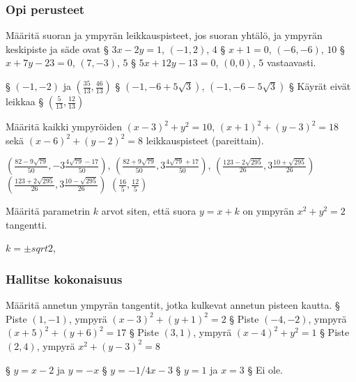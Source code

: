 \begin{tehtavasivu}

\subsubsection*{Opi perusteet}

\begin{tehtava}
Määritä suoran ja ympyrän leikkauspisteet, jos suoran yhtälö, ja ympyrän keskipiste ja säde ovat
\alakohdat
§ $3x-2y = 1$, $(-1,2)$, $4$
§ $x+1 = 0$, $(-6,-6)$, $10$
§ $x+7y-23 = 0$, $(7,-3)$, $5$
§ $5x+12y-13 = 0$, $(0,0)$, $5$
\loppu
vastaavasti.
\begin{vastaus}
\alakohdat
§ $(-1,-2)$ ja $(\frac{35}{13},\frac{46}{13})$
§ $(-1,-6+5\sqrt{3})$, $(-1,-6-5\sqrt{3})$
§ Käyrät eivät leikkaa
§ $(\frac{5}{13},\frac{12}{13})$
\loppu
\end{vastaus}
\end{tehtava}

\begin{tehtava}
Määritä kaikki ympyröiden $ (x-3)^2+y^2= 10$, $(x+1)^2+(y-3)^2 = 18$ sekä $(x-6)^2+(y-2)^2 = 8$ leikkauspisteet (pareittain).
\begin{vastaus}
$(\frac{82-9\sqrt{79}}{50},-3\frac{4\sqrt{79}-17}{50})$, $(\frac{82+9\sqrt{79}}{50},3\frac{4\sqrt{79}+17}{50})$,
$(\frac{123-2\sqrt{295}}{26}, 3\frac{10+\sqrt{295}}{26})$
$(\frac{123+2\sqrt{295}}{26}, 3\frac{10-\sqrt{295}}{26})$
$(\frac{16}{5}, \frac{12}{5})$
\end{vastaus}
\end{tehtava}

\begin{tehtava}
Määritä parametrin $k$ arvot siten, että suora $y=x+k$ on ympyrän  $ x^2+y^2= 2$ tangentti.
\begin{vastaus}
$k = \pm sqrt{2} $,
\end{vastaus}
\end{tehtava}


\subsubsection*{Hallitse kokonaisuus}
\begin{tehtava}
	Määritä annetun ympyrän tangentit, jotka kulkevat annetun pisteen kautta.
	\alakohdat
		§ Piste $(1, -1)$, ympyrä $(x-3)^2 + (y+1)^2 = 2$
		§ Piste $(-4, -2)$, ympyrä $(x+5)^2 + (y+6)^2 = 17$
		§ Piste $(3, 1)$, ympyrä $(x-4)^2 + y^2 = 1$
		§ Piste $(2, 4)$, ympyrä $x^2 + (y-3)^2 = 8$
	\loppu
	\begin{vastaus}
		\alakohdat
			§ $y=x-2$ ja $y=-x$
			§ $y= -1/4 x -3$
			§ $y=1$ ja $x=3$
			§ Ei ole.
		\loppu
	\end{vastaus}
\end{tehtava}


\end{tehtavasivu}
